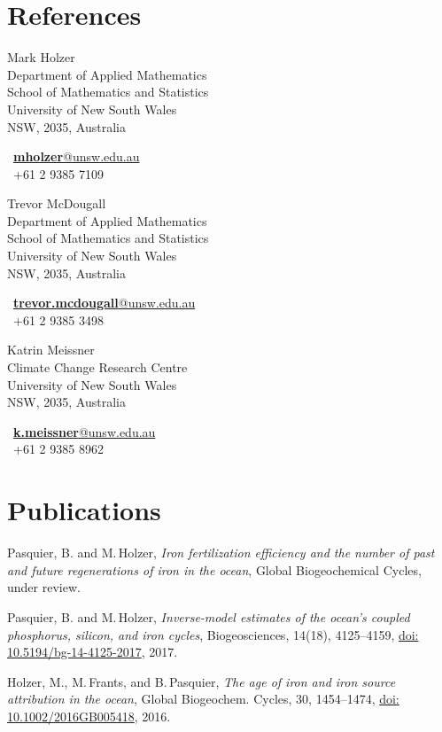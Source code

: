 \documentclass[]{friggeri-cv}
\makeatletter
\newcommand{\cvRefsThreeCols}[3]{
  \begin{minipage}[t]{.3\textwidth}#1\end{minipage}
  \hfill
  \begin{minipage}[t]{.3\textwidth}#2\end{minipage}
  \hfill
  \begin{minipage}[t]{.3\textwidth}#3\end{minipage}
}
\newcommand{\cvreference}[5]{
    {\headingfont\color{headercolor}#1}\\
    {#2}
    \begin{flushright}
    {\faEnvelope~\href{mailto:#3@#4}{\textbf{#3}@#4}\\}
    {\faMobile~#5\\}
    \end{flushright}
}
\makeatother
\begin{document}
\section{References}
\cvRefsThreeCols{
    \cvreference
      {Mark Holzer}
      {Department of Applied Mathematics\\
       School of Mathematics and Statistics\\
       University of New South Wales\\
       NSW, 2035, Australia}
      {mholzer}
      {unsw.edu.au}
      {+61 2 9385 7109}%
  }{
    \cvreference
      {Trevor McDougall}
      {Department of Applied Mathematics\\
       School of Mathematics and Statistics\\
       University of New South Wales\\
       NSW, 2035, Australia}
      {trevor.mcdougall}
      {unsw.edu.au}
      {+61 2 9385 3498}
  }{
    \cvreference
      {Katrin Meissner}
      {Climate Change Research Centre\\
       University of New South Wales\\
       NSW, 2035, Australia}
      {k.meissner}
      {unsw.edu.au}
      {+61 2 9385 8962}
  }
\vspace{10pt}

\section{Publications}

Pasquier, B. and M.\,Holzer, \emph{Iron fertilization efficiency and the number of past and future regenerations of iron in the ocean}, Global Biogeochemical Cycles, under review.

Pasquier, B. and M.\,Holzer, \emph{Inverse-model estimates of the ocean's coupled phosphorus, silicon, and iron cycles}, Biogeosciences, 14(18), 4125--4159, \href{http://dx.doi.org/10.5194/bg-14-4125-2017}{doi: 10.5194/bg-14-4125-2017}, 2017.

Holzer, M., M.\,Frants, and B.\,Pasquier, \emph{The age of iron and iron source attribution in the ocean}, Global Biogeochem. Cycles, 30, 1454--1474, \href{http://dx.doi.org/10.1002/2016GB005418}{doi: 10.1002/2016GB005418}, 2016.
\end{document}
